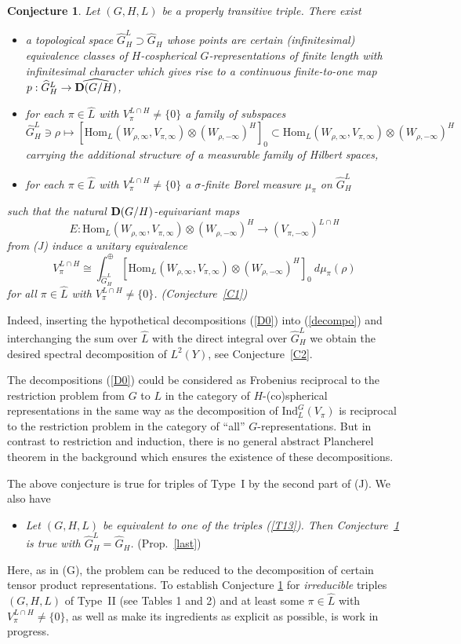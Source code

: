 \documentclass[10]{amsart}
\newtheorem{con}[thm]{Conjecture}
\theoremstyle{remark}
\theoremstyle{definition}
\numberwithin{equation}{section}
\newcommand{\Hom}{\mathrm{Hom}}
\newcommand{\Ind}{\text{Ind}}
\newcommand{\be}{\begin{equation}}
\begin{document}
\begin{con}\label{C0}
Let $(G,H,L)$ be a properly transitive triple. There exist
\begin{itemize} 
\item a topological space $\widehat G_H^L\supset \widehat G_H$ whose points are certain (infinitesimal) equivalence classes of $H$-cospherical $G$-representations of finite
length with infinitesimal character which gives rise to a continuous finite-to-one map $p: \widehat G_H^L\rightarrow \widehat{{\bf D}(G/H)}$,
\item for each $\pi\in\widehat L$ with $V_\pi^{L\cap H}\ne\{0\}$ a family of subspaces 
$$\widehat G_H^L\ni\rho\mapsto\left [\Hom_L(W_{\rho,\infty},V_{\pi,\infty})\otimes (W_{\rho,-\infty})^H\right ]_0\subset \Hom_L(W_{\rho,\infty},V_{\pi,\infty})\otimes (W_{\rho,-\infty})^H$$ 
carrying the additional structure of a measurable family of Hilbert spaces,
\item for each $\pi\in\widehat L$ with $V_\pi^{L\cap H}\ne\{0\}$ a $\sigma$-finite Borel measure $\mu_\pi$ on $\widehat G_H^L$
\end{itemize}
such that the natural ${\bf D}(G/H)$-equivariant maps 
$$   E: \Hom_L(W_{\rho,\infty},V_{\pi,\infty})\otimes (W_{\rho,-\infty})^H\longrightarrow  (V_{\pi,-\infty})^{L\cap H}$$
from (J) induce a unitary equivalence
\be\label{D0}   V_\pi^{L\cap H} \cong \int^\oplus_{\widehat G_H^L}\left [\Hom_L(W_{\rho,\infty},V_{\pi,\infty})\otimes (W_{\rho,-\infty})^H\right ]_0\:d\mu_\pi(\rho)
\end{equation}
for all $\pi\in\widehat L$ with $V_\pi^{L\cap H}\ne\{0\}$. \rm{(Conjecture~\ref{C1})}
\end{con}
Indeed, inserting the hypothetical decompositions (\ref{D0}) into (\ref{decompo}) and interchanging the sum over $\widehat L$ with the direct integral over $\widehat G_H^L$ we obtain the desired
spectral decomposition of $L^2(Y)$, see Conjecture~\ref{C2}.

The decompositions (\ref{D0}) could be considered as Frobenius reciprocal to the restriction problem from $G$ to $L$ in the category of $H$-(co)spherical representations
in the same way as the decomposition of $\Ind_L^G(V_\pi)$ is reciprocal to the restriction problem in the category of  ``all'' $G$-representations.
But in contrast to restriction and induction, there is no general abstract Plancherel theorem in the background which ensures the existence of these decompositions.

The above conjecture is true for triples of Type~I by the second part of (J). We also have
\begin{itemize}
\item[({\bf P})] {\em Let $(G,H,L)$ be equivalent to one of the triples (\ref{T13}). Then Conjecture~\ref{C0} is true with $\widehat G_H^L=\widehat G_H$.} (Prop.~\ref{last})
\end{itemize}
Here, as in (G), the problem can be reduced to the decomposition of certain tensor product representations. To establish Conjecture \ref{C0} for {\em irreducible}  triples $(G,H,L)$ of Type~II
(see Tables 1 and 2)
and at least some $\pi\in\widehat L$ with $V_\pi^{L\cap H}\ne\{0\}$, as well as make its ingredients as explicit as possible, is work in progress.
\end{document}
